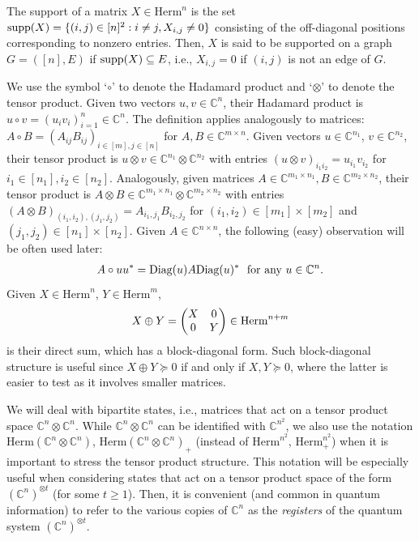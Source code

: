 \documentclass[11pt]{article}
\newcommand{\C}{\ensuremath{\mathbb{C}}} %
\newcommand{\Herm}{\mathrm{Herm}}
\newcommand{\Cnn}{\C^n\ot \C^n}
\newcommand{\Cnt}{(\C^n)^{\ot t}}
\newcommand{\Diag}{\text{\rm Diag}}
\newcommand{\ot}{\otimes}
\newcommand{\supp}{\text{\rm supp}}
\theoremstyle{plain}
\begin{document}
The support of a matrix $X\in \Herm^n$ is the set $\supp(X)=\{(i,j)\in [n]^2: i\ne j, X_{i,j}\ne 0\}$ consisting of the off-diagonal positions corresponding to nonzero entries. Then,  $X$ is said to be supported on a graph $G=([n],E)$ if $\supp(X)\subseteq E$, i.e., $X_{i,j}=0$ if $(i,j)$ is not an edge of $G$.


We use the symbol `$\circ$' to denote the Hadamard product and `$\otimes$' to denote the tensor product. Given two vectors $u,v \in \C^n$, their Hadamard product is $u\circ v=(u_iv_i)_{i=1}^n\in\C^n$. The definition applies analogously to matrices: $A\circ B=(A_{ij}B_{ij})_{i\in [m], j\in [n]}$ for $A,B\in\C^{m\times n}$. Given vectors $u\in \C^{n_1}$, $v\in \C^{n_2}$, their tensor product is
$u\ot v\in \C^{n_1}\ot \C^{n_2}$ with entries $(u\ot v)_{i_1i_2}=u_{i_1}v_{i_2}$ for $i_1\in [n_1],i_2\in [n_2]$. Analogously, given matrices $A\in\C^{m_1\times n_1}, B\in \C^{m_2\times n_2}$, their tensor product is
$A\ot B\in \C^{m_1  \times n_1 }\ot \C^{m_2\times n_2}$ with entries 
$(A\ot B)_{(i_1,i_2),(j_1,j_2)}=A_{i_1,j_1}B_{i_2,j_2}$ for $(i_1,i_2)\in [m_1]\times[m_2]$ and $(j_1,j_2)\in [n_1]\times [n_2]$.
Given $A\in \C^{n\times n}$, the following (easy) observation will be often used later:
\begin{align}\label{eq:Au}
A\circ uu^* = \Diag(u) A \Diag(u)^* \ \text{ for any } u\in \C^n.
\end{align}
Given $X\in \Herm^n$, $Y\in \Herm^m$, 
$$X\oplus Y =\begin{pmatrix}X & 0\cr 0 & Y\end{pmatrix}\in \Herm^{n+m} $$
is their direct sum, which has a block-diagonal form. Such block-diagonal structure is useful since   $X\oplus Y\succeq 0$ if and only if $X,Y\succeq 0$, where the latter is easier to test as it involves smaller matrices. 

\smallskip
We will  deal with bipartite states, i.e., matrices that act on a tensor product space $\Cnn$. While $\Cnn$ can be identified with $\C^{n^2}$,  we also use the notation $\Herm(\Cnn)$, $\Herm(\Cnn)_+$ (instead of $\Herm^{n^2}$, $\Herm^{n^2}_+$) when it is important  to stress the tensor product structure. This notation will be especially useful when considering states that act 
 on a tensor product space of the form $\Cnt$ (for some $t\ge 1$). Then, it  is   convenient (and common in quantum information) to refer to the various copies of $\C^n$  as the  {\em registers} of the quantum system $\Cnt$. 
\end{document}
